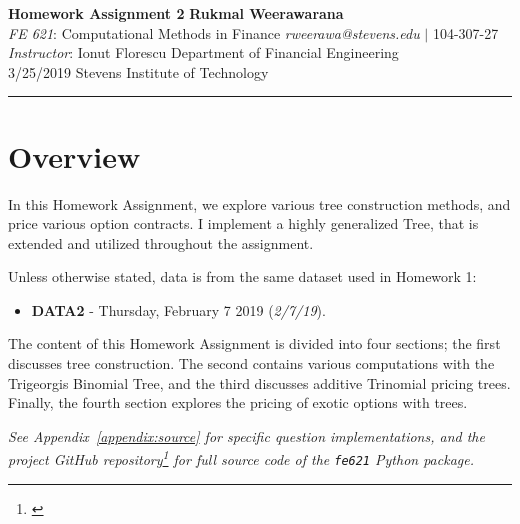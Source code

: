 \documentclass[10pt]{article}
\begin{document}
\thispagestyle{plain}



\noindent
\large\textbf{Homework Assignment 2} \hfill \textbf{Rukmal Weerawarana} \\
\normalsize \textit{FE 621}: Computational Methods in Finance \hfill \textit{rweerawa@stevens.edu} $\mid$ 104-307-27 \\
\textit{Instructor}: Ionut Florescu \hfill Department of Financial Engineering \\
3/25/2019 \hfill Stevens Institute of Technology

\noindent\rule{\linewidth}{.1em}



\section*{Overview}

In this Homework Assignment, we explore various tree construction methods, and price various option contracts. I implement a highly generalized Tree, that is extended and utilized throughout the assignment.

Unless otherwise stated, data is from the same dataset used in Homework 1:

\begin{itemize}
    \item \textbf{DATA2} - Thursday, February 7 2019 (\textit{2/7/19}).
\end{itemize}

The content of this Homework Assignment is divided into four sections; the first discusses tree construction. The second contains various computations with the Trigeorgis Binomial Tree, and the third discusses additive Trinomial pricing trees. Finally, the fourth section explores the pricing of exotic options with trees.

\begin{center}
    \textit{See Appendix~\ref{appendix:source} for specific question implementations, and the project GitHub repository\footnote{\cite{Weerawarana2019}} for full source code of the {\normalfont \texttt{fe621}} Python package.}
\end{center}


\end{document}
